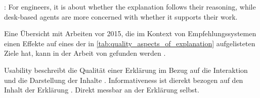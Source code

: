 \cite{martin_evaluating_2021}: For engineers, it is about whether the explanation follows their reasoning, while desk-based agents are more concerned with whether it supports their work.

Eine Übersicht mit Arbeiten vor 2015, die im Kontext von Empfehlungssystemen einen Effekte auf eines der in \autoref{tab:quality_aspects_of_explanation} aufgelisteten Ziele hat, kann in der Arbeit von \citeauthor{nunes_systematic_2017} gefunden werden \cite{nunes_systematic_2017}.

Usability beschreibt die Qualität einer Erklärung im Bezug auf die Interaktion und die Darstellung der Inhalte \cite{chazette_end-users_nodate}. Informativeness ist dierekt bezogen auf den Inhalt der Erklärung \cite{chazette_end-users_nodate}. Direkt messbar an der Erklärung selbst.